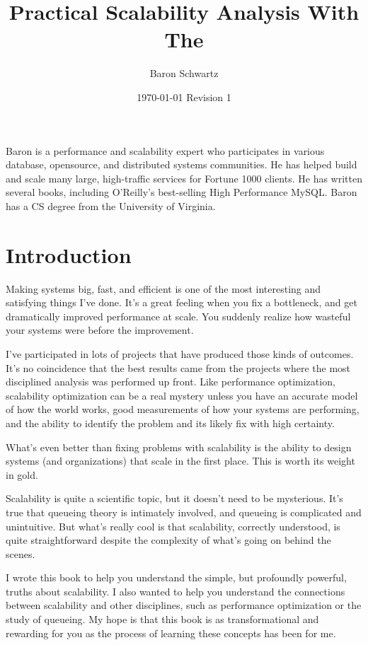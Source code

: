 \documentclass{vivid_layout}
\title{Practical Scalability Analysis With The}{\fontsize{37.5pt}{15pt}\selectfont Universal Scalability Law}
\date{\color{white} \today{} \textbullet{} Revision 1}
\author{Baron Schwartz}{img/baron}
\begin{document}
\maketitle		%
\begin{bio}		%
Baron is a performance and scalability expert who participates in various
database, opensource, and distributed systems communities. He has helped build
and scale many large, high-traffic services for Fortune 1000 clients. He has
written several books, including O'Reilly's best-selling High Performance MySQL.
Baron has a CS degree from the University of Virginia.
\end{bio}
\tableofcontents	%

\section{Introduction}

Making systems big, fast, and efficient is one of the most interesting and
satisfying things I've done. It's a great feeling when you fix a bottleneck, and
get dramatically improved performance at scale. You suddenly realize how
wasteful your systems were before the improvement.

I've participated in lots of projects that have produced those kinds of outcomes.
It's no coincidence that the best results came from the projects where the most
disciplined analysis was performed up front. Like performance optimization,
scalability optimization can be a real mystery unless you have an accurate model
of how the world works, good measurements of how your systems are performing,
and the ability to identify the problem and its likely fix with high certainty.

What's even better than fixing problems with scalability is the ability to
design systems (and organizations) that scale in the first place. This is worth
its weight in gold.

Scalability is quite a scientific topic, but it doesn't need to be mysterious.
It's true that queueing theory is intimately involved, and queueing is
complicated and unintuitive. But what's really cool is that scalability,
correctly understood, is quite straightforward despite the complexity of what's
going on behind the scenes.

I wrote this book to help you understand the simple, but profoundly
powerful, truths about scalability. I also wanted to help you understand the
connections between scalability and other disciplines, such as performance
optimization or the study of queueing. My hope is that this book is as
transformational and rewarding for you as the process of learning these concepts
has been for me.
\end{document}
